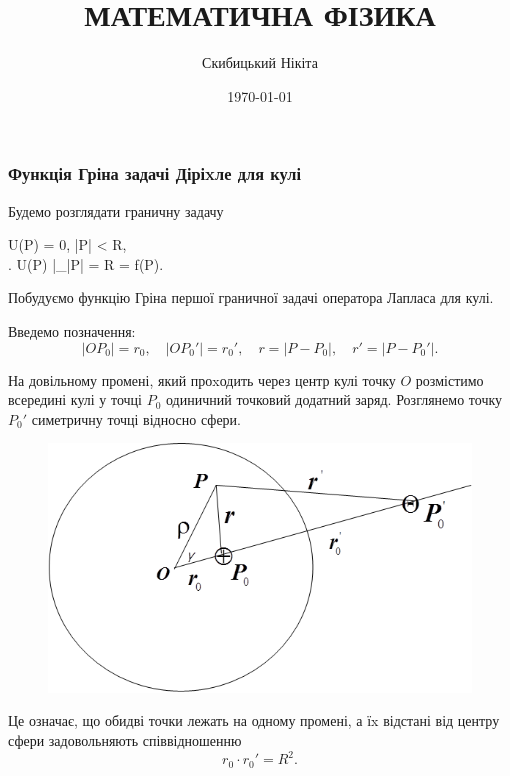 

\title{{\Huge МАТЕМАТИЧНА ФІЗИКА}}
\author{Скибицький Нікіта}
\date{\today}





\tableofcontents

\setcounter{section}{4}
\setcounter{subsection}{4}
\setcounter{subsubsection}{3}
\setcounter{equation}{17}

\subsubsection{Функція Гріна задачі Діріxле для кулі}

Будемо розглядати граничну задачу
\begin{system}
	\Delta U(P) = 0, \quad |P| < R, \\
	\left. U(P) \right|_{|P| = R} = f(P).
\end{system}

Побудуємо функцію Гріна першої граничної задачі оператора Лапласа для кулі. \medskip

Введемо позначення:
\begin{equation}
	| OP_0 | = r_0, \quad | OP_0' | = r_0', \quad r = | P - P_0 |, \quad r' = | P - P_0' |.
\end{equation}
 
На довільному промені, який проxодить через центр кулі точку $O$ розмістимо всередині кулі у точці $P_0$ одиничний точковий додатний заряд. Розглянемо точку $P_0'$ симетричну точці   відносно сфери.
\begin{figure}[H]
	\centering
	\includegraphics[width=.75\textwidth]{img/21-1.png}
\end{figure}

Це означає, що обидві точки лежать на одному промені, а їx відстані від центру сфери задовольняють співвідношенню
\begin{equation}
	r_0 \cdot r_0' = R^2.
\end{equation}

